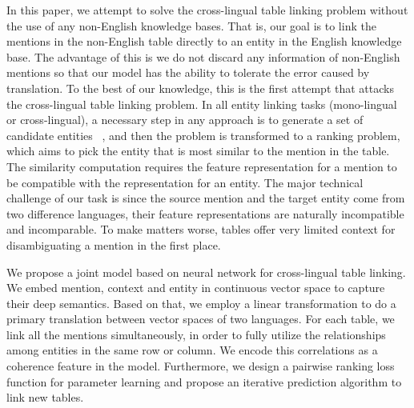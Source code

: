 In this paper, we attempt to solve the cross-lingual table linking problem
without the use of any non-English knowledge bases. That is, our goal is to link the mentions in the non-English table directly to an entity in the English knowledge base. 
The advantage of this is we do not discard any information of non-English mentions so that our model has the ability to tolerate the error caused by translation.
To the best of our knowledge, this is the first attempt that attacks the 
cross-lingual table linking problem. 
In all entity linking tasks (mono-lingual or cross-lingual), 
a necessary step in any approach is to generate a set of candidate entities
~\cite{tsai2016cross,mcnamee2011cross,bhagavatula2015tabel,wu2016entity},
and then the problem is transformed to a ranking problem, which aims to pick
the entity that is most similar to the mention in the table. 
The similarity computation requires the feature representation for a mention to be 
compatible with the representation for an entity. 
The major technical challenge of our task is since the source mention
and the target entity come from two difference languages,
their feature representations are naturally incompatible and incomparable. 
To make matters worse, tables offer very limited context for disambiguating
a mention in the first place.


We propose a joint model based on neural network for cross-lingual table linking. We embed mention, context and entity in continuous vector space to capture their deep semantics.
Based on that, we employ a linear transformation to do a primary translation between vector spaces of two languages. 
For each table, we link all the mentions simultaneously, in order to fully utilize the relationships among entities in the same row or column. We encode this correlations as a coherence feature in the model.
Furthermore, we design a pairwise ranking loss function for parameter learning and propose an iterative prediction algorithm to link new tables.



%

